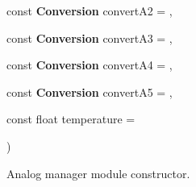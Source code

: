{\begin{DoxyParamCaption}
\item[{const {\bf Conversion}}]{convert\+A2 = {}, }
\item[{const {\bf Conversion}}]{convert\+A3 = {}, }
\item[{const {\bf Conversion}}]{convert\+A4 = {}, }
\item[{const {\bf Conversion}}]{convert\+A5 = {}, }
\item[{const float}]{temperature = {}}
\end{DoxyParamCaption}
)}\hypertarget{class_loom___analog_a3ce93ee8e03835045eb176828cc27add}{}\label{class_loom___analog_a3ce93ee8e03835045eb176828cc27add}


Analog manager module constructor. 


